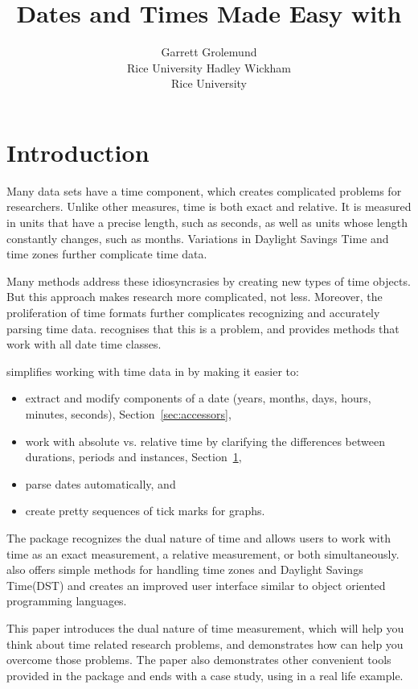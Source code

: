 \documentclass[article]{jss}
\author{Garrett Grolemund\\Rice University \And 
        Hadley Wickham\\Rice University}
\title{Dates and Times Made Easy with \pkg{lubridate}}
\begin{document}
\section{Introduction}

Many data sets have a time component, which creates complicated problems for researchers. Unlike other measures, time is both exact and relative.  It is measured in units that have a precise length, such as seconds, as well as units whose length constantly changes, such as months. Variations in Daylight Savings Time and time zones further complicate time data.

Many  methods address these idiosyncrasies by creating new types of time objects.  But this approach makes research more complicated, not less. Moreover, the proliferation of time formats further complicates recognizing and accurately parsing time data.   recognises that this is a problem, and provides methods that work with all date time classes.


 simplifies working with time data in  by making it easier to:

\begin{itemize}
  \item extract and modify components of a date (years, months, days, hours, minutes, seconds), Section~\ref{sec:accessors},
  
  \item work with absolute vs. relative time by clarifying the differences between durations, periods and instances, Section~\ref{},
  
  \item parse dates automatically, and
  
  \item create pretty sequences of tick marks for graphs.
\end{itemize}

The package recognizes the dual nature of time and allows users to work with time as an exact measurement, a relative measurement, or both simultaneously.  also offers simple methods for handling time zones and Daylight Savings Time(DST) and creates an improved user interface similar to object oriented programming languages.


This paper introduces the dual nature of time measurement, which will help you think about time related research problems, and demonstrates how  can help you overcome those problems. The paper also demonstrates other convenient tools provided in the  package and ends with a case study, using  in a real life example.
\end{document}

